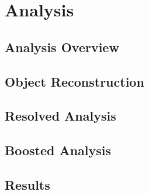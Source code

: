 \chapter{Analysis}

%
\section{Analysis Overview}

\section{Object Reconstruction}

%
\section{Resolved Analysis}
\label{sec:Resolved}

%
\section{Boosted Analysis}
\label{sec:Boosted}

%
\section{Results}



